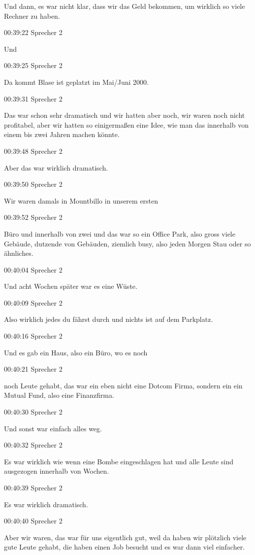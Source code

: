 Und dann, es war nicht klar, dass wir das Geld bekommen, um wirklich so
viele Rechner zu haben.

00:39:22 Sprecher 2

Und

00:39:25 Sprecher 2

Da kommt Blase ist geplatzt im Mai/Juni 2000.

00:39:31 Sprecher 2

Das war schon sehr dramatisch und wir hatten aber noch, wir waren noch
nicht profitabel, aber wir hatten so einigermaßen eine Idee, wie man das
innerhalb von einem bis zwei Jahren machen könnte.

00:39:48 Sprecher 2

Aber das war wirklich dramatisch.

00:39:50 Sprecher 2

Wir waren damals in Mountbillo in unserem ersten

00:39:52 Sprecher 2

Büro und innerhalb von zwei und das war so ein Office Park, also gross
viele Gebäude, dutzende von Gebäuden, ziemlich busy, also jeden Morgen
Stau oder so ähnliches.

00:40:04 Sprecher 2

Und acht Wochen später war es eine Wüste.

00:40:09 Sprecher 2

Also wirklich jedes du fährst durch und nichts ist auf dem Parkplatz.

00:40:16 Sprecher 2

Und es gab ein Haus, also ein Büro, wo es noch

00:40:21 Sprecher 2

noch Leute gehabt, das war ein eben nicht eine Dotcom Firma, sondern ein
ein Mutual Fund, also eine Finanzfirma.

00:40:30 Sprecher 2

Und sonst war einfach alles weg.

00:40:32 Sprecher 2

Es war wirklich wie wenn eine Bombe eingeschlagen hat und alle Leute
sind ausgezogen innerhalb von Wochen.

00:40:39 Sprecher 2

Es war wirklich dramatisch.

00:40:40 Sprecher 2

Aber wir waren, das war für uns eigentlich gut, weil da haben wir
plötzlich viele gute Leute gehabt, die haben einen Job besucht und es
war dann viel einfacher.

